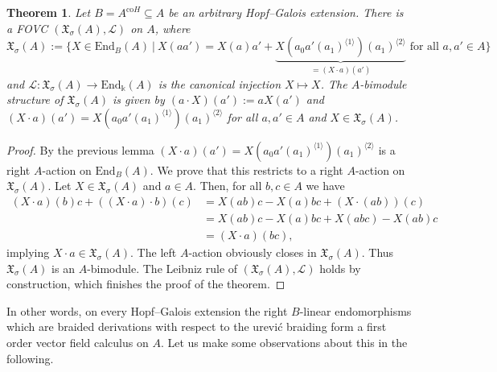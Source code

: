 \documentclass{article}
\newtheorem{theorem}[thm]{Theorem}
\theoremstyle{definition}
\begin{document}
	\begin{theorem}\label{ThmSigmaVC}
		Let $B=A^{\mathrm{co}H}\subseteq A$ be an arbitrary Hopf--Galois extension. There is a FOVC $(\mathfrak{X}_\sigma(A),\mathscr{L})$ on $A$, where
		$$
		\mathfrak{X}_\sigma(A):=\{X\in\mathrm{End}_B(A)~|~X(aa')=X(a)a'+\underbrace{X(a_0a'(a_1)^{\langle 1\rangle})(a_1)^{\langle 2\rangle}}_{=(X\cdot a)(a')}\text{ for all }a,a'\in A\}
		$$
		and $\mathscr{L}\colon\mathfrak{X}_\sigma(A)\to\mathrm{End}_\Bbbk(A)$ is the canonical injection $X\mapsto X$. The $A$-bimodule structure of $\mathfrak{X}_\sigma(A)$ is given by
		$(a\cdot X)(a'):=aX(a')$ and $(X\cdot a)(a')=X(a_0a'(a_1)^{\langle 1\rangle})(a_1)^{\langle 2\rangle}$ for all $a,a'\in A$ and $X\in\mathfrak{X}_\sigma(A)$.
	\end{theorem}
	\begin{proof}
		By the previous lemma $(X\cdot a)(a')=X(a_0a'(a_1)^{\langle 1\rangle})(a_1)^{\langle 2\rangle}$ is a right $A$-action on $\mathrm{End}_B(A)$. We prove that this restricts to a right $A$-action on $\mathfrak{X}_\sigma(A)$. Let $X\in\mathfrak{X}_\sigma(A)$ and $a\in A$. Then, for all $b,c\in A$ we have
		\begin{align*}
			(X\cdot a)(b)c+((X\cdot a)\cdot b)(c)
			&=X(ab)c-X(a)bc+(X\cdot(ab))(c)\\
			&=X(ab)c-X(a)bc+X(abc)-X(ab)c\\
			&=(X\cdot a)(bc),
		\end{align*}
		implying $X\cdot a\in\mathfrak{X}_\sigma(A)$. The left $A$-action obviously closes in $\mathfrak{X}_\sigma(A)$. Thus $\mathfrak{X}_\sigma(A)$ is an $A$-bimodule. The Leibniz rule of $(\mathfrak{X}_\sigma(A),\mathscr{L})$ holds by construction, which finishes the proof of the theorem.
	\end{proof}
	In other words, on every Hopf--Galois extension the right $B$-linear endomorphisms which are braided derivations with respect to the \DJ ur\dj evi\'c braiding form a first order vector field calculus on $A$. Let us make some observations about this in the following.
\end{document}
